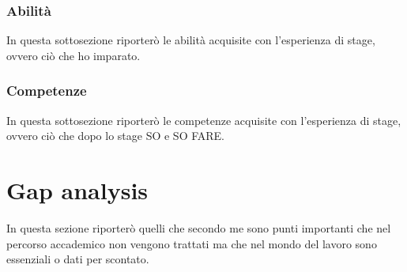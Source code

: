 \subsubsection{Abilità}
In questa sottosezione riporterò le abilità acquisite con l'esperienza di stage, ovvero ciò che ho imparato.

\subsubsection{Competenze}
In questa sottosezione riporterò le competenze acquisite con l'esperienza di stage, ovvero ciò che dopo lo stage SO e SO FARE.

\section{Gap analysis}
In questa sezione riporterò quelli che secondo me sono punti importanti che nel percorso accademico non vengono trattati ma che nel mondo del lavoro sono essenziali o dati per scontato.